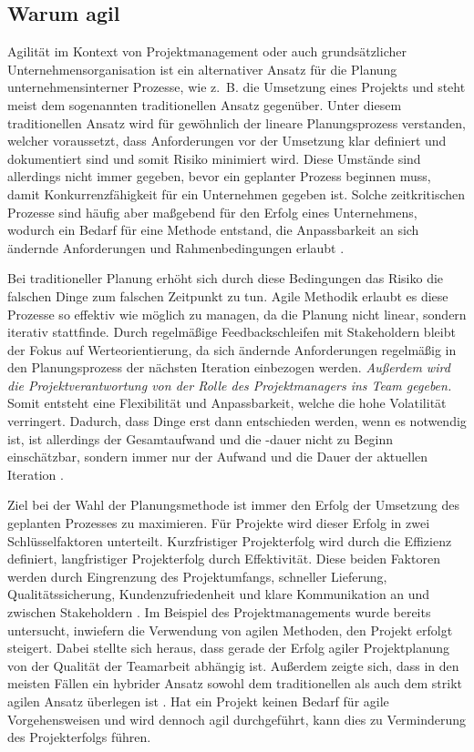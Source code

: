 \subsection{Warum agil}
Agilität im Kontext von Projektmanagement oder auch grundsätzlicher Unternehmensorganisation ist ein alternativer Ansatz für die Planung unternehmensinterner Prozesse, wie z. B. die Umsetzung eines Projekts und steht meist dem sogenannten traditionellen Ansatz gegenüber. Unter diesem traditionellen Ansatz wird für gewöhnlich der lineare Planungsprozess verstanden, welcher voraussetzt, dass Anforderungen vor der Umsetzung klar definiert und dokumentiert sind und somit Risiko minimiert wird. Diese Umstände sind allerdings nicht immer gegeben, bevor ein geplanter Prozess beginnen muss, damit Konkurrenzfähigkeit für ein Unternehmen gegeben ist. Solche zeitkritischen Prozesse sind häufig aber maßgebend für den Erfolg eines Unternehmens, wodurch ein Bedarf für eine Methode entstand, die Anpassbarkeit an sich ändernde Anforderungen und Rahmenbedingungen erlaubt \cite{agilismVsTranditionalApproaches}.

Bei traditioneller Planung erhöht sich durch diese Bedingungen das Risiko die falschen Dinge zum falschen Zeitpunkt zu tun. Agile Methodik erlaubt es diese Prozesse so effektiv wie möglich zu managen, da die Planung nicht linear, sondern iterativ stattfinde. Durch regelmäßige Feedbackschleifen mit Stakeholdern bleibt der Fokus auf Werteorientierung, da sich ändernde Anforderungen regelmäßig in den Planungsprozess der nächsten Iteration einbezogen werden. \emph{Außerdem wird die Projektverantwortung von der Rolle des Projektmanagers ins Team gegeben.} Somit entsteht eine Flexibilität und Anpassbarkeit, welche die hohe Volatilität verringert. Dadurch, dass Dinge erst dann entschieden werden, wenn es notwendig ist, ist allerdings der Gesamtaufwand und die -dauer nicht zu Beginn einschätzbar, sondern immer nur der Aufwand und die Dauer der aktuellen Iteration \cite{agilismVsTranditionalApproaches}.

Ziel bei der Wahl der Planungsmethode ist immer den Erfolg der Umsetzung des geplanten Prozesses zu maximieren. Für Projekte wird dieser Erfolg in zwei Schlüsselfaktoren unterteilt. Kurzfristiger Projekterfolg wird durch die Effizienz definiert, langfristiger Projekterfolg durch Effektivität. Diese beiden Faktoren werden durch Eingrenzung des Projektumfangs, schneller Lieferung, Qualitätssicherung, Kundenzufriedenheit und klare Kommunikation an und zwischen Stakeholdern \cite{traditionalAndAgileOnProjectSuccess}. Im Beispiel des Projektmanagements wurde bereits untersucht, inwiefern die Verwendung von agilen Methoden, den Projekt erfolgt steigert. Dabei stellte sich heraus, dass gerade der Erfolg agiler Projektplanung von der Qualität der Teamarbeit abhängig ist.
Außerdem zeigte sich, dass in den meisten Fällen ein hybrider Ansatz sowohl dem traditionellen als auch dem strikt agilen Ansatz überlegen ist \cite{traditionalAndAgileOnProjectSuccess}.
Hat ein Projekt keinen Bedarf für agile Vorgehensweisen und wird dennoch agil durchgeführt, kann dies zu Verminderung des Projekterfolgs führen.

